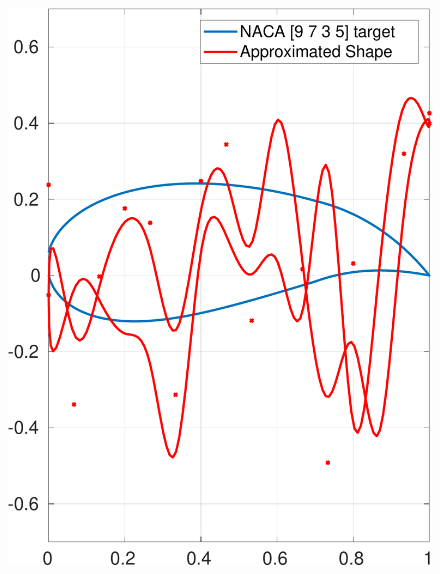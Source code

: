 \documentclass[paper=a4, fontsize=11pt]{scrartcl} %
\begin{document}
    \begin{figure}[H]
    \centering
    \begin{minipage}{.5\textwidth}
        \centering
        \includegraphics[width=.95\linewidth]{a3-shapematch-9735-init}
        \label{fig:initial}
    \end{minipage}%
    \begin{minipage}{.5\textwidth}
        \centering

\end{minipage}
\end{figure}
\end{document}
